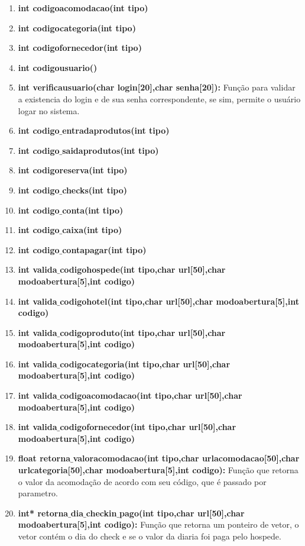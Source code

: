 \documentclass{article}
\begin{document}
\begin{enumerate}
		\item \textbf{int codigoacomodacao(int tipo)}
		\item \textbf{int codigocategoria(int tipo)}
		\item \textbf{int codigofornecedor(int tipo)}
		\item \textbf{int codigousuario()}
		\item \textbf{int verificausuario(char login[20],char senha[20]): }Função para validar a existencia do login e de sua senha correspondente, se sim, permite o usuário logar no sistema.\\
		\item \textbf{int codigo$\_$entradaprodutos(int tipo)}
		\item \textbf{int codigo$\_$saidaprodutos(int tipo)}
		\item \textbf{int codigoreserva(int tipo)}
		\item \textbf{int codigo$\_$checks(int tipo)}
		\item \textbf{int codigo$\_$conta(int tipo)}
		\item \textbf{int codigo$\_$caixa(int tipo)}
		\item \textbf{int codigo$\_$contapagar(int tipo)}
		\item \textbf{int valida$\_$codigohospede(int tipo,char url[50],char modoabertura[5],int codigo)}
		\item \textbf{int valida$\_$codigohotel(int tipo,char url[50],char modoabertura[5],int codigo)}
		\item \textbf{int valida$\_$codigoproduto(int tipo,char url[50],char modoabertura[5],int codigo)}
		\item \textbf{int valida$\_$codigocategoria(int tipo,char url[50],char modoabertura[5],int codigo)}
		\item \textbf{int valida$\_$codigoacomodacao(int tipo,char url[50],char modoabertura[5],int codigo)}
		\item \textbf{int valida$\_$codigofornecedor(int tipo,char url[50],char modoabertura[5],int codigo)}
		\item \textbf{float retorna$\_$valoracomodacao(int tipo,char urlacomodacao[50],char urlcategoria[50],char modoabertura[5],int codigo): }Função que retorna o valor da acomodação de acordo com seu código, que é passado por parametro.\\
		\item \textbf{int* retorna$\_$dia$\_$checkin$\_$pago(int tipo,char url[50],char modoabertura[5],int codigo): }Função que retorna um ponteiro de vetor, o vetor contém o dia do check e se o valor da diaria foi paga pelo hospede.\\

\end{enumerate}
\end{document}

